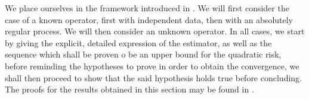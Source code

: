 We place ourselves in the framework introduced in .
We will first consider the case of a known operator, first with independent data, then with an absolutely regular process.
We will then consider an unknown operator.
In all cases, we start by giving the explicit, detailed expression of the estimator, as well as the sequence which shall be proven o be an upper bound for the quadratic risk, before reminding the hypotheses to prove in order to obtain the convergence, we shall then proceed to show that the said hypothesis holds true before concluding.
The proofs for the results obtained in this section may be found in .




